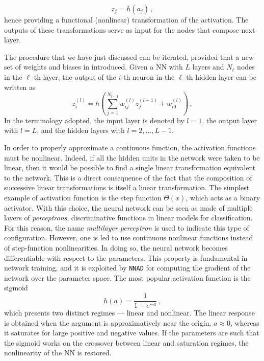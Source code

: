 \begin{equation}
  z_{j} = h(a_j)\,,
\end{equation}
hence providing a functional (nonlinear) transformation of the activation. The outputs of these transformations serve as input for the nodes that compose next layer.\par The procedure that we have just discussed can be iterated, provided that a new set of weights and biases in introduced. Given a NN with $L$ layers and $N_{\ell}$ nodes in the $\ell$-th layer, the output of the $i$-th neuron in the $\ell$-th hidden layer can be written as
\begin{equation}
  z_{i}^{(l)} = h \left( \sum_{j=1}^{N_{l-1}} w_{ij}^{(l)} z_{j}^{(l-1)} + w_{i0}^{(l)} \right) \,,
  \label{eq:activity}
\end{equation}
In the terminology adopted, the input layer is denoted by $l=1$, the output layer with $l=L$, and the hidden layers with $l=2,\dots,L-1$.\par
In order to properly approximate a continuous function, the activation functions must be nonlinear. Indeed, if all the hidden units in the network were taken to be linear, then it would be possible to find a single linear transformation equivalent to the network. This is a direct consequence of the fact that the composition of successive linear transformations is itself a linear transformation. The simplest example of activation function is the step function $\Theta(x)$, which acts as a binary activator. With this choice, the neural network can be seen as made of multiple layers of \textit{perceptrons}, discriminative functions in linear models for classification. For this reason, the name \textit{multilayer perceptron} is used to indicate this type of configuration. However, one is led to use continuous nonlinear functions instead of step-function nonlinearities. In doing so, the neural network becomes differentiable with respect to the parameters. This property is fundamental in network training, and it is exploited by \texttt{NNAD} for computing the gradient of the network over the parameter space. The most popular activation function is the sigmoid
\begin{equation}
  h(a) = \frac{1}{1 - e^{-a}}\,,
  \label{eq:sigmoid}
\end{equation}
which presents two distinct regimes — linear and nonlinear. The linear response is obtained when the argument is approximatively near the origin, $a \approx 0$, whereas it saturates for large positive and negative values. If the parameters are such that the sigmoid works on the crossover between linear and saturation regimes, the nonlinearity of the NN is restored.\par
